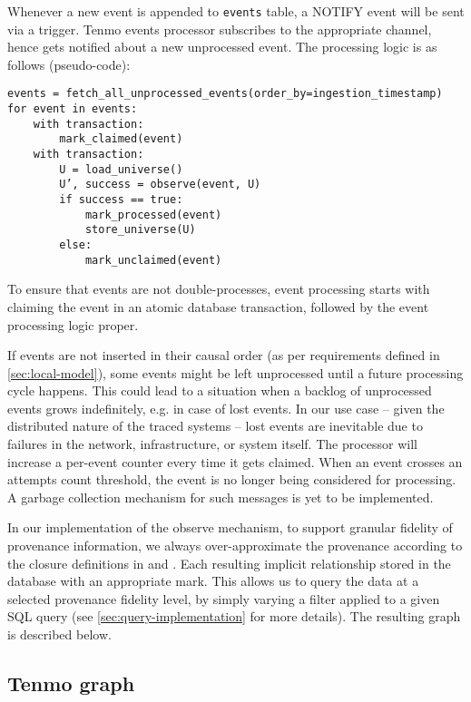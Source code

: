 Whenever a new event is appended to \texttt{events} table, a NOTIFY event will be sent via a trigger. Tenmo events processor subscribes to the appropriate channel, hence gets notified about a new unprocessed event. The processing logic is as follows (pseudo-code):
%
\begin{verbatim}
events = fetch_all_unprocessed_events(order_by=ingestion_timestamp)
for event in events:
    with transaction:
        mark_claimed(event)
    with transaction:
        U = load_universe()
        U’, success = observe(event, U)
        if success == true:
            mark_processed(event)
            store_universe(U)
        else:
            mark_unclaimed(event)
\end{verbatim}

To ensure that events are not double-processes, event processing starts with claiming the event in an atomic database transaction, followed by the event processing logic proper. 

If events are not inserted in their causal order (as per requirements defined in \cref{sec:local-model}), some events might be left unprocessed until a future processing cycle happens. This could lead to a situation when a backlog of unprocessed events grows indefinitely, e.g. in case of lost events. In our use case -- given the distributed nature of the traced systems -- lost events are inevitable due to failures in the network, infrastructure, or system itself. The processor will increase a per-event counter every time it gets claimed. When an event crosses an attempts count threshold, the event is no longer being considered for processing. A garbage collection mechanism for such messages is yet to be implemented.

In our implementation of the observe mechanism, to support granular fidelity of provenance information, we always over-approximate the provenance according to the closure definitions in  and . Each resulting implicit relationship stored in the database with an appropriate mark. This allows us to query the data at a selected provenance fidelity level, by simply varying a filter applied to a given SQL query (see \cref{sec:query-implementation} for more details). The resulting graph is described below.

\subsection{Tenmo graph}\label{sec:tenmo-graph-queries-implementation}

